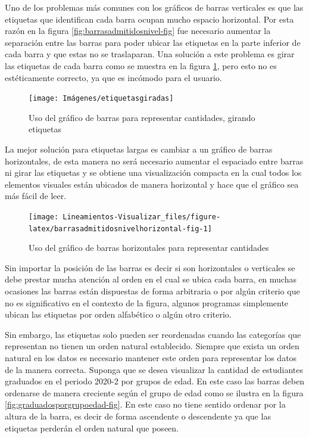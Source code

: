 \documentclass[
]{book}
\begin{document}
Uno de los problemas más comunes con los gráficos de barras verticales es que las etiquetas que identifican cada barra ocupan mucho espacio horizontal. Por esta razón en la figura \ref{fig:barrasadmitidosnivel-fig} fue necesario aumentar la separación entre las barras para poder ubicar las etiquetas en la parte inferior de cada barra y que estas no se traslaparan. Una solución a este problema es girar las etiquetas de cada barra como se muestra en la figura \ref{fig:barrasadmitidosnivelgirar-fig}, pero esto no es estéticamente correcto, ya que es incómodo para el usuario.

\begin{figure}

{\centering \texttt{[image: Imágenes/etiquetasgiradas]} 

}

\caption{Uso del gráfico de barras para representar cantidades, girando etiquetas}\label{fig:barrasadmitidosnivelgirar-fig}
\end{figure}

La mejor solución para etiquetas largas es cambiar a un gráfico de barras horizontales, de esta manera no será necesario aumentar el espaciado entre barras ni girar las etiquetas y se obtiene una visualización compacta en la cual todos los elementos visuales están ubicados de manera horizontal y hace que el gráfico sea más fácil de leer.

\begin{figure}

{\centering \texttt{[image: Lineamientos-Visualizar\_files/figure-latex/barrasadmitidosnivelhorizontal-fig-1]} 

}

\caption{Uso del gráfico de barras horizontales para representar cantidades}\label{fig:barrasadmitidosnivelhorizontal-fig}
\end{figure}

Sin importar la posición de las barras es decir si son horizontales o verticales se debe prestar mucha atención al orden en el cual se ubica cada barra, en muchas ocasiones las barras están dispuestas de forma arbitraria o por algún criterio que no es significativo en el contexto de la figura, algunos programas simplemente ubican las etiquetas por orden alfabético o algún otro criterio.

Sin embargo, las etiquetas solo pueden ser reordenadas cuando las categorías que representan no tienen un orden natural establecido. Siempre que exista un orden natural en los datos es necesario mantener este orden para representar los datos de la manera correcta. Suponga que se desea visualizar la cantidad de estudiantes graduados en el periodo 2020-2 por grupos de edad. En este caso las barras deben ordenarse de manera creciente según el grupo de edad como se ilustra en la figura \ref{fig:graduadosporgrupoedad-fig}. En este caso no tiene sentido ordenar por la altura de la barra, es decir de forma ascendente o descendente ya que las etiquetas perderán el orden natural que poseen.
\end{document}
